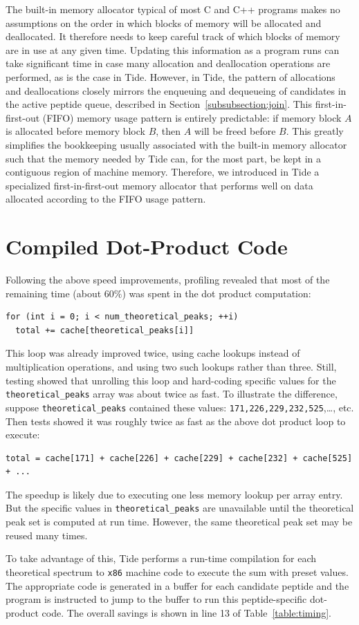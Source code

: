 The built-in memory allocator typical of most C and C++ programs makes
no assumptions on the order in which blocks of memory will be
allocated and deallocated. It therefore needs to keep careful track of
which blocks of memory are in use at any given time. Updating this
information as a program runs can take significant time in case many
allocation and deallocation operations are performed, as is the case
in Tide. However, in Tide, the pattern of allocations and
deallocations closely mirrors the enqueuing and dequeueing of
candidates in the active peptide queue, described in
Section~\ref{subsubsection:join}. This first-in-first-out (FIFO)
memory usage pattern is entirely predictable: if memory block $A$ is
allocated before memory block $B$, then $A$ will be freed before
$B$. This greatly simplifies the bookkeeping usually associated with
the built-in memory allocator such that the memory needed by Tide can,
for the most part, be kept in a contiguous region of machine
memory. Therefore, we introduced in Tide a specialized
first-in-first-out memory allocator that performs well on data
allocated according to the FIFO usage pattern.

\section{Compiled Dot-Product Code \label{subsubsection:compiler}}

Following the above speed improvements, profiling revealed that most
of the remaining time (about $60\%$) was spent in the dot product
computation:
\begin{verbatim}
for (int i = 0; i < num_theoretical_peaks; ++i)
  total += cache[theoretical_peaks[i]]
\end{verbatim}

This loop was already improved twice, using cache lookups instead of
multiplication operations, and using two such lookups rather than
three. Still, testing showed that unrolling this loop and hard-coding
specific values for the {\tt theoretical\_peaks} array was about twice
as fast. To illustrate the difference, suppose
{\tt theoretical\_peaks} contained these values:
{\tt 171,226,229,232,525},\ldots, etc.
Then tests showed it was roughly twice as fast as the above dot
product loop to execute:
\begin{verbatim}
total = cache[171] + cache[226] + cache[229] + cache[232] + cache[525] + ...
\end{verbatim}
The speedup is likely due to executing one less memory lookup per
array entry. But the specific values in {\tt theoretical\_peaks} are
unavailable until the theoretical peak set is computed at run
time. However, the same theoretical peak set may be reused many times.

To take advantage of this, Tide performs a run-time compilation for
each theoretical spectrum to {\tt x86} machine code to execute the
sum with preset values. The appropriate code is generated in a buffer
for each candidate peptide and the program is instructed to jump to
the buffer to run this peptide-specific dot-product code. The overall
savings is shown in line 13 of Table~\ref{table:timing}.





